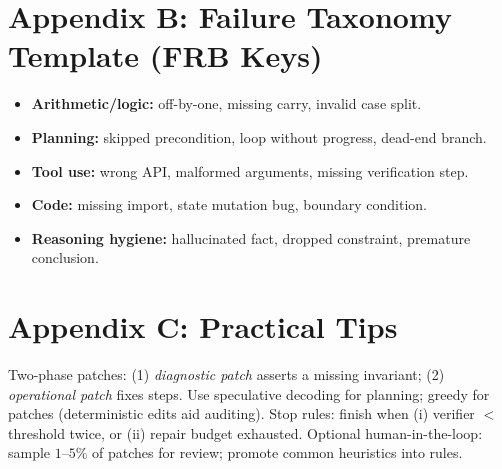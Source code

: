 \documentclass[11pt]{article}
\begin{document}
\section{Appendix B: Failure Taxonomy Template (FRB Keys)}
\begin{itemize}[leftmargin=1.2em]
    \item \textbf{Arithmetic/logic:} off-by-one, missing carry, invalid case split.
    \item \textbf{Planning:} skipped precondition, loop without progress, dead-end branch.
    \item \textbf{Tool use:} wrong API, malformed arguments, missing verification step.
    \item \textbf{Code:} missing import, state mutation bug, boundary condition.
    \item \textbf{Reasoning hygiene:} hallucinated fact, dropped constraint, premature conclusion.
\end{itemize}

\section{Appendix C: Practical Tips}
Two-phase patches: (1) \emph{diagnostic patch} asserts a missing invariant; (2) \emph{operational patch} fixes steps. Use speculative decoding for planning; greedy for patches (deterministic edits aid auditing). Stop rules: finish when (i) verifier $<$ threshold twice, or (ii) repair budget exhausted. Optional human-in-the-loop: sample $1$--$5\%$ of patches for review; promote common heuristics into rules.
\end{document}
